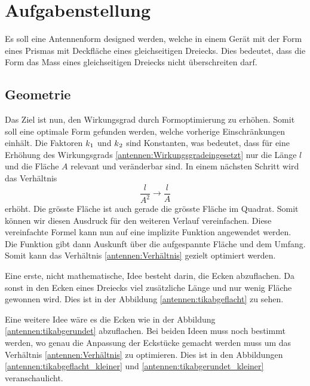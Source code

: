 %
%
% 
%
%

\section{Aufgabenstellung\label{antennen:problemstellung}}
 Es soll eine Antennenform designed werden, welche in einem Gerät mit der Form 
 eines Prismas mit Deckfläche eines gleichseitigen Dreiecks. Dies bedeutet, dass 
 die Form das Mass eines gleichseitigen Dreiecks nicht überschreiten darf.
 
\subsection{Geometrie\label{antennen:Geom}}
Das Ziel ist nun, den Wirkungsgrad durch Formoptimierung zu erhöhen. Somit soll eine optimale Form
gefunden werden, welche vorherige Einschränkungen einhält.
Die Faktoren $k\textsubscript{1}$ und $k\textsubscript{2}$ sind Konstanten, 
was bedeutet, dass für eine Erhöhung des Wirkungsgrads \eqref{antennen:Wirkungsgradeingesetzt} nur die Länge 
$l$ und die Fläche $A$ relevant und veränderbar sind. In einem nächsten Schritt wird das Verhältnis
\begin{equation}
	\frac{l}{A^2} \rightarrow \frac{l}{A}
	\label{antennen:Verhältnis}
\end{equation}
erhöht. 
Die grösste Fläche ist auch gerade die grösste Fläche im Quadrat. Somit können wir diesen Ausdruck 
für den weiteren Verlauf vereinfachen. Diese vereinfachte Formel kann nun auf eine implizite 
Funktion angewendet werden. Die Funktion gibt dann Auskunft über die aufgespannte Fläche und 
dem Umfang. Somit kann das Verhältnis \eqref{antennen:Verhältnis} gezielt optimiert werden. 

Eine erste, nicht mathematische, Idee besteht darin, die Ecken abzuflachen. Da sonst in den Ecken
eines Dreiecks viel zusätzliche Länge und nur wenig Fläche gewonnen wird. Dies ist in der Abbildung
\ref{antennen:tikabgeflacht} zu sehen. 

Eine weitere Idee wäre es die Ecken wie in der Abbildung \ref{antennen:tikabgerundet} abzuflachen. Bei
beiden Ideen muss noch bestimmt werden, wo genau die Anpassung der Eckstücke gemacht werden muss um 
das Verhältnis \eqref{antennen:Verhältnis} zu optimieren. Dies ist in den Abbildungen 
\ref{antennen:tikabgeflacht_kleiner} und \ref{antennen:tikabgerundet_kleiner} veranschaulicht.

